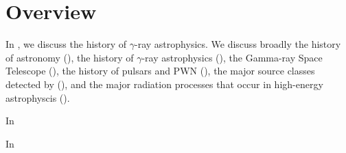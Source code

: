 
\chapter{Overview}

In , we discuss the history of $\gamma$-ray
astrophysics. We discuss broadly the history of astronomy
(), the history of $\gamma$-ray
astrophysics (), the \fermi
Gamma-ray Space Telescope (), the history of
pulsars and \ac{PWN} (), the major source
classes detected by \fermi (), and
the major radiation processes that occur in high-energy astrophyscis
().

In 


In 









